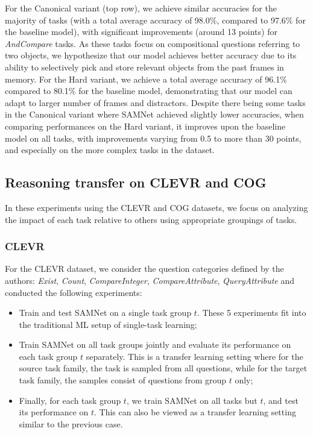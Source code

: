 For the Canonical variant (top row), we achieve similar accuracies for the majority of tasks (with a total average accuracy of 98.0\%, 
compared to 97.6\% for the baseline model), with significant improvements (around 13 points) for \textit{AndCompare} tasks.
As these tasks focus on compositional questions referring to two objects, we hypothesize that our model achieves better 
accuracy due to its ability to selectively pick and store relevant objects from the past frames in memory.
For the Hard variant, we achieve a total average accuracy of 96.1\% compared to 80.1\% for the baseline model, demonstrating
that our model can adapt to larger number of frames and distractors.
Despite there being some tasks in the Canonical variant where SAMNet achieved slightly lower accuracies,
when comparing performances on the Hard variant, it improves upon the baseline model on all tasks, 
with improvements varying from 0.5 to more than 30 points, and especially on the more complex tasks in the dataset.

\subsection{Reasoning transfer on CLEVR and COG}
\label{sec:reasoning}
In these experiments using the CLEVR and COG datasets, we focus on analyzing the impact 
of each task relative to others using appropriate groupings of tasks.

\subsubsection{CLEVR}
\label{sec:reasoning-clevr}
For the CLEVR dataset, we consider the question categories defined by the authors: \textit{Exist}, \textit{Count}, \textit{CompareInteger}, \textit{CompareAttribute}, \textit{QueryAttribute} and conducted the following experiments:
\begin{itemize}
	\compresslist
	\item Train and test SAMNet on a single task group $t$. These 5 experiments fit into the traditional ML setup of single-task learning;
	\item Train SAMNet on all task groups jointly and evaluate its performance on each task group $t$ separately.
	This is a transfer learning setting where for the source task family, the task is sampled from all questions,
	while for the target task family, the samples consist of questions from group $t$ only;
	\item Finally, for each task group $t$, we train SAMNet on all tasks but $t$, and test its performance on $t$.
	This can also be viewed as a transfer learning setting similar to the previous case.
\end{itemize}

